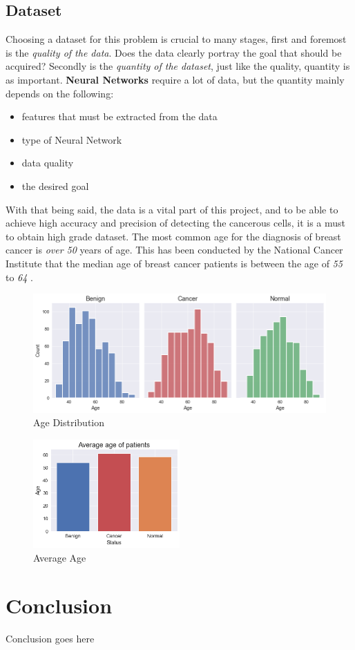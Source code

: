 \documentclass[12pt]{extarticle}
\begin{document}
	\subsection{Dataset}\label{Data}
	
	Choosing a dataset for this problem is crucial to many stages, first and foremost is the \emph{quality of the data}. Does the data clearly portray the goal that should be acquired? Secondly is the \emph{quantity of the dataset}, just like the quality, quantity is as important. \textbf{Neural Networks} require a lot of data, but the quantity mainly depends on the following:
	\begin{itemize}
		\item features that must be extracted from the data
		\item type of Neural Network
		\item data quality
		\item the desired goal
	\end{itemize}
	With that being said, the data is a vital part of this project, and to be able to achieve high accuracy and precision of detecting the cancerous cells, it is a must to obtain high grade dataset. 
	The most common age for the diagnosis of breast cancer is \emph{over 50} years of age. This has been conducted by the National Cancer Institute that the median age of breast cancer patients is between the age of \emph{55} to \emph{64} \cite{CDC}. 
	\\[5mm]
	
	
	\begin{figure}[h]
		\centering
		\includegraphics[width=1\textwidth]{pics/Figures/Age_Dist.png}
		\caption{\small{Age Distribution}}
		\label{fig:Age_Dist}
	\end{figure}
	\begin{figure}[h]
		\centering
		\includegraphics[width=0.5\textwidth]{pics/Figures/Avg_Age.png}
		\caption{\small{Average Age}}
		\label{fig:Avg_Age}
	\end{figure}
	
	\newpage	
	\section{Conclusion}
	Conclusion goes here
	\newpage

	
	
	
	
\end{document}
